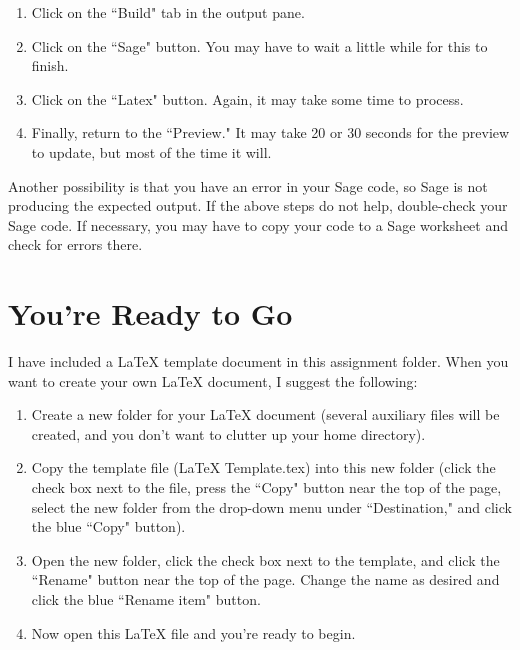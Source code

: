 \documentclass[12pt]{article}
\begin{document}
\begin{enumerate}

\item Click on the ``Build" tab in the output pane.

\item Click on the ``Sage" button. You may have to wait a little while for this to finish.

\item Click on the ``Latex" button. Again, it may take some time to process.

\item Finally, return to the ``Preview." It may take 20 or 30 seconds for the preview to update, but most of the time it will.

\end{enumerate}

Another possibility is that you have an error in your Sage code, so Sage is not producing the expected output. If the above steps do not help, double-check your Sage code. If necessary, you may have to copy your code to a Sage worksheet and check for errors there.

\section{You're Ready to Go}

I have included a \LaTeX{} template document in this assignment folder. When you want to create your own \LaTeX{} document, I suggest the following:

\begin{enumerate}

\item Create a new folder for your \LaTeX{} document (several auxiliary files will be created, and you don't want to clutter up your home directory).

\item Copy the template file (LaTeX Template.tex) into this new folder (click the check box next to the file, press the ``Copy" button near the top of the page, select the new folder from the drop-down menu under ``Destination," and click the blue ``Copy" button).

\item Open the new folder, click the check box next to the template, and click the ``Rename" button near the top of the page. Change the name as desired and click the blue ``Rename item" button.

\item Now open this \LaTeX{} file and you're ready to begin.

\end{enumerate}
\end{document}
